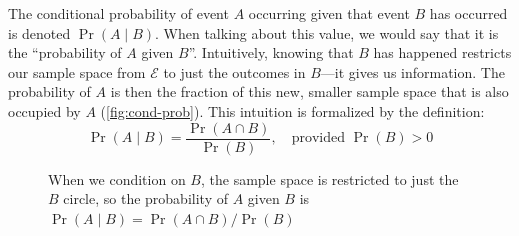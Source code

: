 The conditional probability of event $A$ occurring given that event $B$ has occurred is denoted $\Pr(A \mid B)$. When talking about this value, we would say that it is the ``probability of $A$ given $B$''. Intuitively, knowing that $B$ has happened restricts our sample space from $\mathcal{E}$ to just the outcomes in $B$---it gives us information. The probability of $A$ is then the fraction of this new, smaller sample space that is also occupied by $A$ (\autoref{fig:cond-prob}). This intuition is formalized by the definition:
\begin{equation}
    \Pr(A \mid B) = \frac{\Pr(A \cap B)}{\Pr(B)}, \quad \text{provided } \Pr(B) > 0
    \label{eq:cond-prob}
\end{equation}

\begin{figure}[h]
    \centering
    \caption{When we condition on $B$, the sample space is restricted to just the $B$ circle, so the probability of $A$ given $B$ is $\Pr(A\mid B)=\Pr(A\cap B)/\Pr(B)$}
    \label{fig:cond-prob}
\end{figure}

